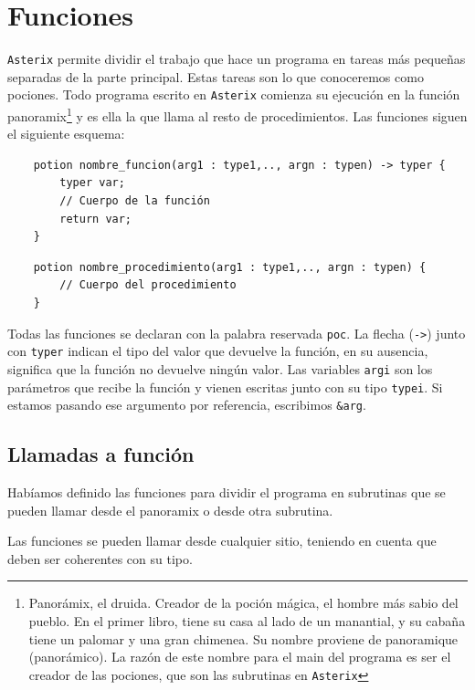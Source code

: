 \documentclass[a4paper, 9pt]{article}
\newcommand{\atx}{\texttt{Asterix} }
\begin{document}
    \section*{Funciones}
    \atx permite dividir el trabajo que hace un programa en tareas más
    pequeñas separadas de la parte principal. Estas tareas son lo que conoceremos
    como pociones. Todo programa escrito en \atx comienza su ejecución en la
    función \textsf{panoramix}\footnote{Panorámix, el druida. Creador de la
    poción mágica, el hombre más sabio del pueblo. En el primer libro, tiene su
    casa al lado de un manantial, y su cabaña tiene un palomar y una gran
    chimenea. Su nombre proviene de panoramique (panorámico). La razón de este
    nombre para el main del programa es ser el creador de las pociones, que son
    las subrutinas en \atx} y es ella la que llama al resto de procedimientos.
    Las funciones siguen el siguiente esquema: 

    \begin{verbatim}
    potion nombre_funcion(arg1 : type1,.., argn : typen) -> typer {
        typer var;
        // Cuerpo de la función
        return var; 
    }
    \end{verbatim}

    \begin{verbatim}
    potion nombre_procedimiento(arg1 : type1,.., argn : typen) {
        // Cuerpo del procedimiento
    }
    \end{verbatim}
    
    Todas las funciones se declaran con la palabra reservada \texttt{poc}. La
    flecha (\texttt{->}) junto con \texttt{typer} indican el tipo del valor que
    devuelve la función, en su ausencia, significa que la función no devuelve
    ningún valor. Las variables \texttt{argi} son los parámetros que recibe la
    función y vienen escritas junto con su tipo \texttt{typei}. Si estamos
    pasando ese argumento por referencia, escribimos \texttt{\&arg}.
    
    \subsection*{Llamadas a función}
    Habíamos definido las funciones para dividir el programa en subrutinas que
    se pueden llamar desde el \textsf{panoramix} o desde otra subrutina.
    
    Las funciones se pueden llamar desde cualquier sitio, teniendo en cuenta
    que deben ser coherentes con su tipo.
    
\end{document}

